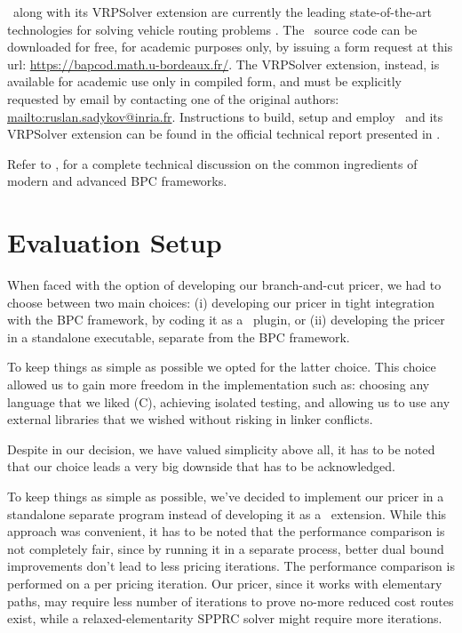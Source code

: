 \medskip

\bapcod\ along with its VRPSolver extension are currently the leading state-of-the-art
technologies for solving vehicle routing problems \parencite{pessoa2020a}.
The \bapcod\ source code can be downloaded for free, for academic purposes only,
by issuing a form request at this url: \url{https://bapcod.math.u-bordeaux.fr/}.
The VRPSolver extension, instead, is available for academic use only in compiled form,
and must be explicitly requested by email by contacting one of the
original authors: \url{mailto:ruslan.sadykov@inria.fr}.
Instructions to build, setup and employ \bapcod\ and its VRPSolver extension
can be found in the official technical report presented in \textcite{sadykov2021}.

Refer to \textcite{sadykov2019b},
for a complete technical discussion on the common ingredients of modern and advanced BPC frameworks.

\section{Evaluation Setup}
\label{sec:results-evaluation-setup}

When faced with the option of developing our branch-and-cut pricer,
we had to choose between two main choices:
(i) developing our pricer in tight integration with the BPC framework,
by coding it as a \bapcod\ plugin,
or (ii) developing the pricer in a standalone executable,
separate from the BPC framework.

To keep things as simple as possible we opted for the latter choice.
This choice allowed us to gain more freedom in the implementation
such as: choosing any language that we liked (C),
achieving isolated testing,
and allowing us to use any external libraries
that we wished without risking in linker conflicts.

Despite in our decision, we have valued simplicity above all,
it has to be noted that our choice leads a very big downside that has to be acknowledged.

To keep things as simple as possible, we've decided to implement our
pricer in a standalone separate program instead of developing it as a \bapcod\ extension.
While this approach was convenient, it has to be noted that the performance comparison is not
completely fair, since by running it in a separate process, better dual bound improvements
don't lead to less pricing iterations.
The performance comparison is performed on a per pricing iteration.
Our pricer, since it works with elementary paths, may require less number of iterations
to prove no-more reduced cost routes exist, while a relaxed-elementarity SPPRC solver
might require more iterations.

